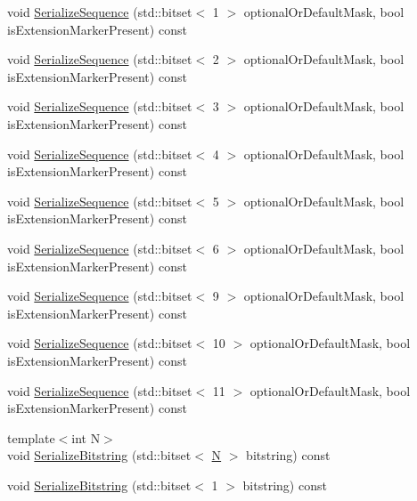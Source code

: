 \begin{DoxyCompactItemize}
\item 
void \hyperlink{classns3_1_1Asn1Header_aa0a75260f514d3363abeb7db545975b4}{Serialize\+Sequence} (std\+::bitset$<$ 1 $>$ optional\+Or\+Default\+Mask, bool is\+Extension\+Marker\+Present) const 
\item 
void \hyperlink{classns3_1_1Asn1Header_a862d9bb5e2b4f1a494127d9a85b2c880}{Serialize\+Sequence} (std\+::bitset$<$ 2 $>$ optional\+Or\+Default\+Mask, bool is\+Extension\+Marker\+Present) const 
\item 
void \hyperlink{classns3_1_1Asn1Header_a7c3faf6b138a49eefaea6e8ec9f4b52d}{Serialize\+Sequence} (std\+::bitset$<$ 3 $>$ optional\+Or\+Default\+Mask, bool is\+Extension\+Marker\+Present) const 
\item 
void \hyperlink{classns3_1_1Asn1Header_a2b901d5a1802676ebc0a59894c46c2ba}{Serialize\+Sequence} (std\+::bitset$<$ 4 $>$ optional\+Or\+Default\+Mask, bool is\+Extension\+Marker\+Present) const 
\item 
void \hyperlink{classns3_1_1Asn1Header_ac96a495e01666e22e6f5309354a80b1a}{Serialize\+Sequence} (std\+::bitset$<$ 5 $>$ optional\+Or\+Default\+Mask, bool is\+Extension\+Marker\+Present) const 
\item 
void \hyperlink{classns3_1_1Asn1Header_a4daaf8806f5a9bd3b42b52616b1f100e}{Serialize\+Sequence} (std\+::bitset$<$ 6 $>$ optional\+Or\+Default\+Mask, bool is\+Extension\+Marker\+Present) const 
\item 
void \hyperlink{classns3_1_1Asn1Header_a878b37e1a6657d334767583ed7fb7065}{Serialize\+Sequence} (std\+::bitset$<$ 9 $>$ optional\+Or\+Default\+Mask, bool is\+Extension\+Marker\+Present) const 
\item 
void \hyperlink{classns3_1_1Asn1Header_a123d2e999230d1586e5a82d95bfe5fa2}{Serialize\+Sequence} (std\+::bitset$<$ 10 $>$ optional\+Or\+Default\+Mask, bool is\+Extension\+Marker\+Present) const 
\item 
void \hyperlink{classns3_1_1Asn1Header_ad028cbe62cf9d71070e6ddb6e1843f1e}{Serialize\+Sequence} (std\+::bitset$<$ 11 $>$ optional\+Or\+Default\+Mask, bool is\+Extension\+Marker\+Present) const 
\item 
{\footnotesize template$<$int N$>$ }\\void \hyperlink{classns3_1_1Asn1Header_a0be8d507b87be07f85f35b906f8e5da7}{Serialize\+Bitstring} (std\+::bitset$<$ \hyperlink{loss__ITU1238_8m_aaa6c78b1d659f53598dbe891c1139b3e}{N} $>$ bitstring) const 
\item 
void \hyperlink{classns3_1_1Asn1Header_a05d97c99ce61d220f4d98f8a871b9873}{Serialize\+Bitstring} (std\+::bitset$<$ 1 $>$ bitstring) const 

\end{DoxyCompactItemize}

